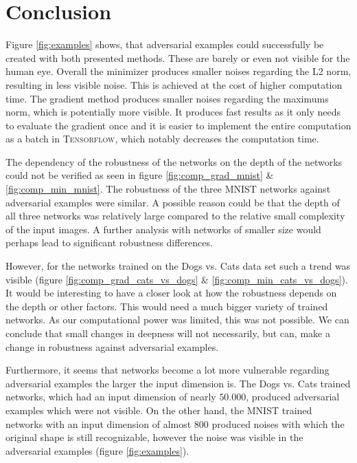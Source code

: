 \documentclass[%
 reprint,
 amsmath,amssymb,
 aps,
]{revtex4-1}
\begin{document}
\section{Conclusion}

Figure \ref{fig:examples} shows, that adversarial examples could successfully be created with both presented methods. These are barely or even not visible for the human eye. Overall the minimizer produces smaller noises regarding the L2 norm, resulting in less visible noise. This is achieved at the cost of higher computation time. The gradient method produces smaller noises regarding the maximums norm, which is potentially more visible. It produces fast results as it only needs to evaluate the gradient once and it is easier to implement the entire computation as a batch in \textsc{Tensorflow}, which notably decreases the computation time.

The dependency of the robustness of the networks on the depth of the networks could not be verified as seen in figure \ref{fig:comp_grad_mnist} \& \ref{fig:comp_min_mnist}. The robustness of the three MNIST networks against adversarial examples were similar. A possible reason could be that the depth of all three networks was relatively large compared to the relative small complexity of the input images. A further analysis with networks of smaller size would perhaps lead to significant robustness differences.

However, for the networks trained on the Dogs vs. Cats data set such a trend was visible (figure \ref{fig:comp_grad_cats_vs_dogs} \& \ref{fig:comp_min_cats_vs_dogs}). It would be interesting to have a closer look at how the robustness depends on the depth or other factors. This would need a much bigger variety of trained networks. As our computational power was limited, this was not possible. We can conclude that small changes in deepness will not necessarily, but can, make a change in robustness against adversarial examples.

Furthermore, it seems that networks become a lot more vulnerable regarding adversarial examples the larger the input dimension is. The Dogs vs. Cats trained networks, which had an input dimension of nearly $50.000$, produced adversarial examples which were not visible. On the other hand, the MNIST trained networks with an input dimension of almost $800$ produced noises with which the original shape is still recognizable, however the noise was visible in the adversarial examples (figure \ref{fig:examples}).



\end{document}
